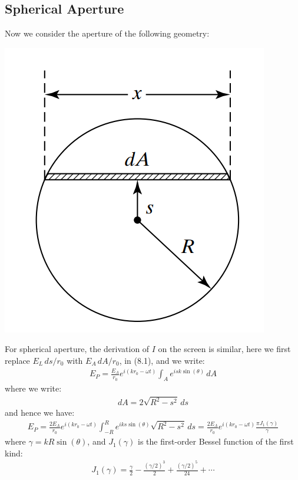 \documentclass[11pt]{book}
\theoremstyle{break}
\theoremstyle{break}
\begin{document}
\subsection{Spherical Aperture}
Now we consider the aperture of the following geometry:
\begin{center}
\includegraphics[scale=0.5]{spherical}
\end{center}
For spherical aperture, the derivation of $I$ on the screen is similar, here we first replace $E_L\,  ds/r_0$ with $E_A\,  dA/r_0$, in (8.1), and we write:
\begin{align*}
E_P = \frac{E_A}{r_0}e^{i(kr_0 - \omega t)}\int_A e^{isk\sin(\theta)}\, dA
\end{align*}
where we write:
\begin{align*}
dA = 2\sqrt{R^2 - s^2}\, ds
\end{align*}
and hence we have:
\begin{align*}
E_P = \frac{2E_A}{r_0}e^{i(kr_0 - \omega t)}\int_{-R}^R e^{iks\sin(\theta)}\sqrt{R^2 - s^2}\, ds =  \frac{2E_A}{r_0}e^{i(kr_0 - \omega t)} \frac{\pi J_1(\gamma)}{\gamma}
\end{align*}
where $\gamma = kR\sin(\theta)$, and $J_1(\gamma)$ is the first-order Bessel function of the first kind:
\begin{align*}
J_1(\gamma) = \frac{\gamma}{2} - \frac{(\gamma/2)^3}{2} + \frac{(\gamma/2)^5}{24}+\cdots
\end{align*}
\end{document}
